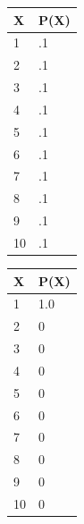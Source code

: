 \begin{figure}
  \begin{center}
    \begin{subfigure}[b]{0.3\textwidth}
       \begin{center}
      \begin{tabular}[b]{|l|l|}
    \hline
    X            & P(X) \\
    \hline
    1       & .1    \\
    \hline
    2        & .1   \\
    \hline
    3        & .1     \\
    \hline
    4        & .1      \\
    \hline
    5   & .1     \\
    \hline
    6      & .1   \\
    \hline
    7   & .1  \\
    \hline
    8      & .1     \\
    \hline
    9 & .1    \\
    \hline
    10 & .1    \\
    \hline
      \end{tabular}
       \end{center}
      \caption{}
    \end{subfigure}
    \begin{subfigure}[b]{0.3\textwidth}
       \begin{center}
        \begin{tabular}[b]{|l|l|}
     \hline
    X            & P(X) \\
    \hline
    1       & 1.0    \\
    \hline
    2        & 0   \\
    \hline
    3        & 0     \\
    \hline
    4        & 0      \\
    \hline
    5   & 0     \\
    \hline
    6      & 0   \\
    \hline
    7   & 0  \\
    \hline
    8      & 0     \\
    \hline
    9 & 0    \\
    \hline
    10 & 0    \\
    \hline
        \end{tabular}
         \end{center}
      \caption{}
    \end{subfigure}
    \begin{subfigure}[b]{0.3\textwidth}

\end{subfigure}
\end{center}
\end{figure}
